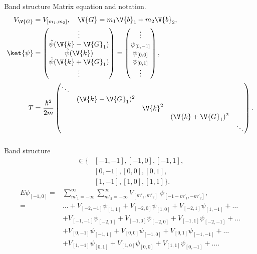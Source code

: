 \documentclass{beamer}
\newcommand{\coef}[1]{_{[#1]}}
\begin{document}
\begin{frame}{Band structure}
Matrix equation and notation.
\begin{align*}
V_{\V{G}} &= V\coef{m_1, m_2}, \quad \V{G} = m_1 \V{b}_1 + m_2 \V{b}_2, \\
\ket{\psi} &= \begin{pmatrix}
\vdots \\ \tilde{\psi}(\V{k}-\V{G}_1) \\ \tilde{\psi}(\V{k}) \\ \tilde{\psi}(\V{k}+\V{G}_1) \\ \vdots
\end{pmatrix} = \begin{pmatrix}
\vdots \\ \psi\coef{0, -1}\\ \psi\coef{0, 0} \\ \psi\coef{0, 1} \\ \vdots
\end{pmatrix}, \\
T &= \frac{\hbar^2}{2m} \begin{pmatrix}
\ddots	& 		 			&			& 					& \\
& (\V{k}-\V{G}_1)^2	& 			& 					& \\
& 	 				& \V{k}^2	& 					& \\
&					&			& (\V{k}+\V{G}_1)^2	& \\
&					&			&					& \ddots
\end{pmatrix}.
\end{align*}
\begin{equation*}
\end{equation*}
\end{frame}


\begin{frame}{Band structure}
\begin{align*}
[m_1, m_2] \in \{ &[-1, -1], [-1, 0], [-1, 1],\\ &[0, -1], [0, 0], [0, 1],\\ &[1,-1], [1, 0], [1,1]  \}.
\end{align*}
\begin{align*}
E \psi\coef{-1,0} = {} & \sum_{m'_1 =  -\infty}^{\infty}\sum_{m'_2 = -\infty}^{\infty} V\coef{m'_1, m'_2} \ \psi\coef{-1-m'_1, -m'_2}, \\
= {} & \dots +  V\coef{-2, -1}\psi\coef{1,1} + V\coef{-2, 0} \psi\coef{1, 0} + V\coef{-2, 1}\psi\coef{1,-1} +  \dots  \\
& + V\coef{-1, -1} \psi\coef{-2, 1} + V\coef{-1, 0} \psi\coef{-2, 0} + V\coef{-1, 1} \psi\coef{-2, -1} + \dots\\
& + V\coef{0, -1} \psi\coef{-1, 1} + V\coef{0, 0} \psi\coef{-1, 0} + V\coef{0, 1}\psi\coef{-1, -1} + \dots\\
&+ V\coef{1, -1} \psi \coef{0,1} + V\coef{1, 0} \psi \coef{0, 0} + V\coef{1,1} \psi \coef{0, -1} + \dots.
\end{align*}
\end{frame}
\end{document}
